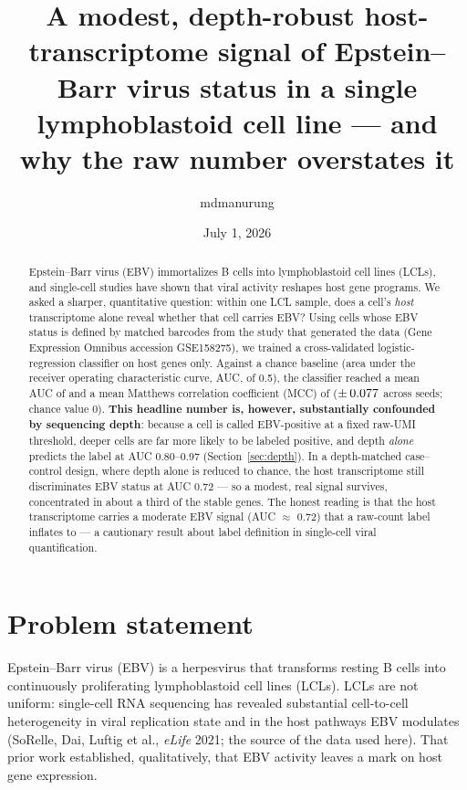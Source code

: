 \documentclass[11pt]{article}
\title{A modest, depth-robust host-transcriptome signal of Epstein--Barr virus
status in a single lymphoblastoid cell line --- and why the raw number overstates it}
\author{mdmanurung}
\date{July 1, 2026}
\begin{document}
\maketitle

\begin{abstract}
Epstein--Barr virus (EBV) immortalizes B cells into lymphoblastoid cell lines
(LCLs), and single-cell studies have shown that viral activity reshapes host
gene programs. We asked a sharper, quantitative question: within one LCL sample,
does a cell's \emph{host} transcriptome alone reveal whether that cell carries
EBV? Using  cells whose EBV status is defined by
matched barcodes from the study that generated the data (Gene Expression Omnibus
accession GSE158275), we trained a cross-validated logistic-regression classifier
on host genes only. Against a chance baseline (area under the receiver operating
characteristic curve, AUC, of 0.5), the classifier reached a mean AUC of
 and a mean Matthews correlation coefficient (MCC) of
 ($\pm\,0.077$ across seeds; chance
value 0). \textbf{This headline number is, however, substantially confounded by
sequencing depth}: because a cell is called EBV-positive at a fixed raw-UMI
threshold, deeper cells are far more likely to be labeled positive, and depth
\emph{alone} predicts the label at AUC 0.80--0.97 (Section~\ref{sec:depth}). In a
depth-matched case--control design, where depth alone is reduced to chance, the host
transcriptome still discriminates EBV status at AUC 0.72 --- so a modest, real signal
survives, concentrated in about a third of the  stable genes.
The honest reading is that the host transcriptome carries a moderate EBV signal
(AUC $\approx$ 0.72) that a raw-count label inflates to  --- a
cautionary result about label definition in single-cell viral quantification.
\end{abstract}

\tableofcontents

\section{Problem statement}
Epstein--Barr virus (EBV) is a herpesvirus that transforms resting B cells into
continuously proliferating lymphoblastoid cell lines (LCLs). LCLs are not
uniform: single-cell RNA sequencing has revealed substantial cell-to-cell
heterogeneity in viral replication state and in the host pathways EBV modulates
(SoRelle, Dai, Luftig et al., \emph{eLife} 2021; the source of the data used
here). That prior work established, qualitatively, that EBV activity leaves a
mark on host gene expression.
\end{document}
